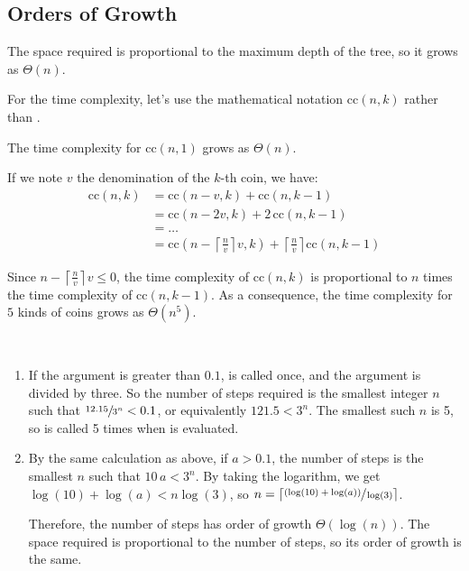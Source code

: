 \subsection{Orders of Growth}

\begin{exe}[1.14]
    The space required is proportional to the maximum depth of the tree, so it 
    grows as $\Theta(n)$.

    For the time complexity, let’s use the mathematical notation $\text{cc}(n, 
    k)$ rather than .

    The time complexity for $\text{cc}(n, 1)$ grows as $\Theta(n)$.

    If we note $v$ the denomination of the $k$-th coin, we have:
    \begin{align*}
        \text{cc}(n, k) &= \text{cc}(n - v, k) + \text{cc}(n, k - 1) \\
                        &= \text{cc}(n - 2v, k) + 2\, \text{cc}(n, k - 1) \\
                        &= … \\
                        &= \text{cc}(n - \left\lceil \frac{n}{v} \right\rceil v, 
                        k) + \left\lceil \frac{n}{v} \right\rceil \text{cc}(n, 
                        k - 1)
    \end{align*}

    Since $n - \left\lceil \frac{n}{v} \right\rceil v \leq 0$, the time 
    complexity of $\text{cc}(n, k)$ is proportional to $n$ times the time 
    complexity of $\text{cc}(n, k - 1)$. As a consequence, the time complexity 
    for $5$ kinds of coins grows as $\Theta(n^5)$.
\end{exe}

\begin{exe}[1.15]
    \ \vspace{-20pt}
    \begin{enumerate}
        \item If the argument is greater than $0.1$,  is called once, 
            and the argument is divided by three. So the number of steps 
            required is the smallest integer $n$ such that $\sfrac{12.15}{3^n} 
            < 0.1$, or equivalently $121.5 < 3^n$. The smallest such $n$ is 5, 
            so  is called 5 times when  is evaluated.
        \item By the same calculation as above, if $a > 0.1$, the number of 
            steps is the smallest $n$ such that $10 \, a < 3^n$. By taking the 
            logarithm, we get $\log(10) + \log(a) < n \log(3)$, so $n 
            = \left\lceil \sfrac{(\log(10) + \log(a))}{\log(3)} \right\rceil$.

            Therefore, the number of steps has order of growth 
            $\Theta(\log(n))$. The space required is proportional to the number 
            of steps, so its order of growth is the same.
    \end{enumerate}
\end{exe}

